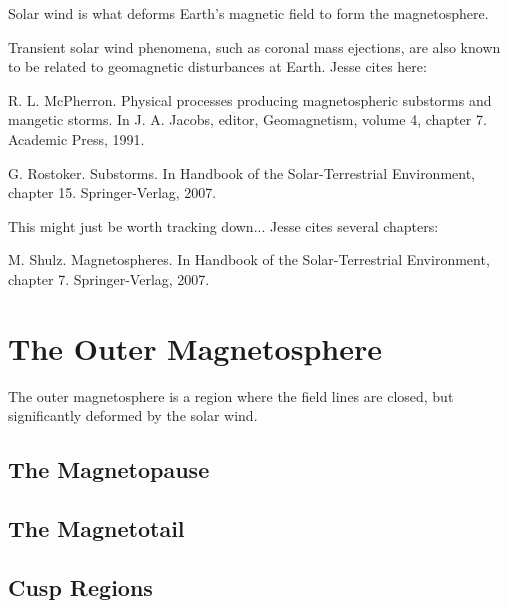 Solar wind is what deforms Earth's magnetic field to form the magnetosphere. 

Transient solar wind phenomena, such as coronal mass ejections, are also known to be related to geomagnetic disturbances at Earth. Jesse cites here: 

R. L. McPherron. Physical processes producing magnetospheric substorms and mangetic storms. In J. A. Jacobs, editor, Geomagnetism, volume 4, chapter 7. Academic Press, 1991.

G. Rostoker. Substorms. In Handbook of the Solar-Terrestrial Environment, chapter 15. Springer-Verlag, 2007.

This might just be worth tracking down... Jesse cites several chapters: 

M. Shulz. Magnetospheres. In Handbook of the Solar-Terrestrial Environment, chapter 7. Springer-Verlag, 2007.





\section{The Outer Magnetosphere}

The outer magnetosphere is a region where the field lines are closed, but significantly deformed by the solar wind. 

\subsection{The Magnetopause}

\subsection{The Magnetotail}

\subsection{Cusp Regions}

